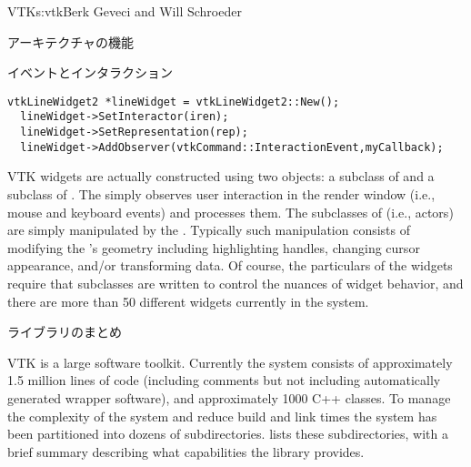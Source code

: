 \begin{aosachapter}{VTK}{s:vtk}{Berk Geveci and Will Schroeder}
\begin{aosasect1}{アーキテクチャの機能}
\begin{aosasect2}{イベントとインタラクション}
\begin{verbatim}
vtkLineWidget2 *lineWidget = vtkLineWidget2::New();
  lineWidget->SetInteractor(iren);
  lineWidget->SetRepresentation(rep);
  lineWidget->AddObserver(vtkCommand::InteractionEvent,myCallback);
\end{verbatim}

VTK widgets are actually constructed using two objects: a subclass of
 and a subclass of . The
 simply observes user interaction in the
render window (i.e., mouse and keyboard events) and processes
them. The subclasses of  (i.e., actors) are simply
manipulated by the . Typically such
manipulation consists of modifying the 's geometry
including highlighting handles, changing cursor appearance, and/or
transforming data. Of course, the particulars of the widgets require
that subclasses are written to control the nuances of widget behavior,
and there are more than 50 different widgets currently in the system.

\end{aosasect2}

\begin{aosasect2}{ライブラリのまとめ}

VTK is a large software toolkit. Currently the system consists of
approximately 1.5 million lines of code (including comments but not
including automatically generated wrapper software), and approximately
1000 C++ classes. To manage the complexity of the system and reduce
build and link times the system has been partitioned into dozens of
subdirectories.  lists these subdirectories,
with a brief summary describing what capabilities the library
provides.


\end{aosasect2}
\end{aosasect1}
\end{aosachapter}
